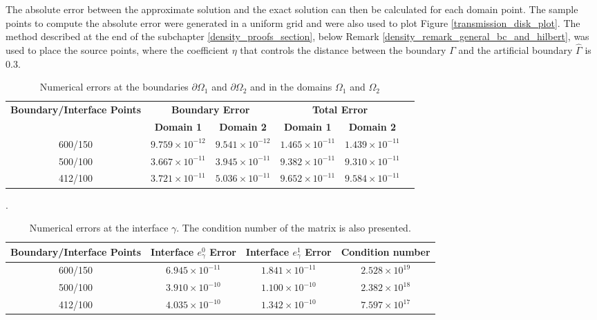 The absolute error between the approximate solution and the exact solution can then be calculated for each domain point. The sample points to compute the absolute error were generated in a uniform grid and were also used to plot Figure \ref{transmission_disk_plot}. The method described at the end of the subchapter \ref{density_proofs_section}, below Remark \ref{density_remark_general_bc_and_hilbert}, was used to place the source points, where the coefficient \(\eta\) that controls the distance between the boundary \(\Gamma\) and the artificial boundary \(\hat{\Gamma}\) is \(0.3\).

\begin{table}[htbp]
    \centering
    \begin{tabular}{cccccc}
        \toprule
        \multirow{2}{*}{\textbf{Boundary/Interface Points}} & \multicolumn{2}{c}{\textbf{Boundary Error}} & \multicolumn{2}{c}{\textbf{Total Error}} \\
        \cmidrule(lr){2-3} \cmidrule(lr){4-5}
        & \textbf{Domain 1} & \textbf{Domain 2} & \textbf{Domain 1} & \textbf{Domain 2} \\
        \midrule
        600/150 & $9.759\times10^{-12}$ & $9.541\times10^{-12}$ & $1.465\times10^{-11}$ & $1.439\times10^{-11}$ \\
        500/100 & $3.667\times10^{-11}$ & $3.945\times10^{-11}$ & $9.382\times10^{-11}$ & $9.310\times10^{-11}$ \\
        412/100 & $3.721\times10^{-11}$ & $5.036\times10^{-11}$ & $9.652\times10^{-11}$ & $9.584\times10^{-11}$ \\
        \bottomrule
    \end{tabular}
    \caption{Numerical errors at the boundaries \(\partial\Omega_1\) and \(\partial \Omega_2\) and in the domains \(\Omega_1\) and \(\Omega_2\)}.
    \label{tab:transmission_results_1}
\end{table}


\begin{table}[htbp]
    \centering
    \begin{tabular}{cccc}
      \toprule
      \textbf{Boundary/Interface Points} & \textbf{Interface \(e_\gamma^0\) Error} & \textbf{Interface \(e_\gamma^1\) Error} & \textbf{Condition number} \\
      \midrule
      600/150 & $6.945\times10^{-11}$ & $1.841\times10^{-11}$ & $2.528\times 10^{19}$\\
      500/100 & $3.910\times10^{-10}$ & $1.100\times10^{-10}$ & $2.382\times 10^{18}$\\
      412/100 & $4.035\times10^{-10}$ & $1.342\times10^{-10}$ & $7.597\times 10^{17}$\\
      \bottomrule
    \end{tabular}
    \caption{Numerical errors at the interface \(\gamma\). The condition number of the matrix is also presented.}
    \label{tab:transmission_results_2}
\end{table}

